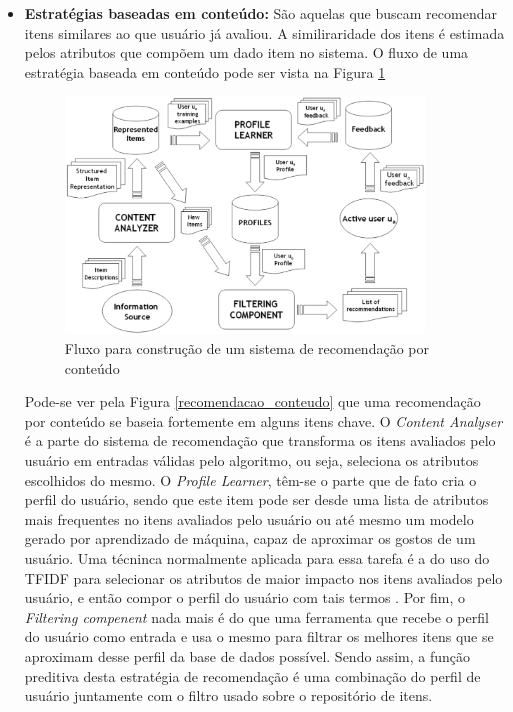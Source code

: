 \begin{itemize}
    \item \textbf{Estratégias baseadas em conteúdo: } São aquelas que buscam
        recomendar itens similares ao que usuário já avaliou. A similiraridade
        dos itens é estimada pelos atributos que compõem um dado item no
        sistema. O fluxo de uma estratégia baseada em conteúdo pode ser vista na
        Figura \ref{fig:recomendacao_conteudo}

        \begin{figure}[h]
            \centering
            \includegraphics[width=0.9\textwidth]{figuras/recomendacao_conteudo}
            \caption{Fluxo para construção de um sistema de recomendação por
            conteúdo \cite{lops2011content}}
            \label{fig:recomendacao_conteudo}
        \end{figure}

        Pode-se ver pela Figura \ref{recomendacao_conteudo} que uma recomendação
        por conteúdo se baseia fortemente em alguns itens chave. O
        \textit{Content Analyser} é a parte do sistema de recomendação que
        transforma os itens avaliados pelo usuário em entradas válidas pelo
        algoritmo, ou seja, seleciona os atributos escolhidos do mesmo. O
        \textit{Profile Learner}, têm-se o parte que de fato cria o perfil do
        usuário, sendo que este item pode ser desde uma lista de atributos mais
        frequentes no itens avaliados pelo usuário ou até mesmo um modelo gerado
        por aprendizado de máquina, capaz de aproximar os gostos de um usuário.
        Uma técninca normalmente aplicada para essa tarefa é a do uso do TFIDF
        para selecionar os atributos de maior impacto nos itens avaliados pelo
        usuário, e então compor o perfil do usuário com tais termos
        \cite{lops2011content}. Por fim, o \textit{Filtering compenent} nada mais é do que uma
        ferramenta que recebe o perfil do usuário como entrada e usa o mesmo
        para filtrar os melhores itens que se aproximam desse perfil da base de
        dados possível. Sendo assim, a função preditiva desta estratégia de
        recomendação é uma combinação do perfil de usuário juntamente com o
        filtro usado sobre o repositório de itens.


\end{itemize}
